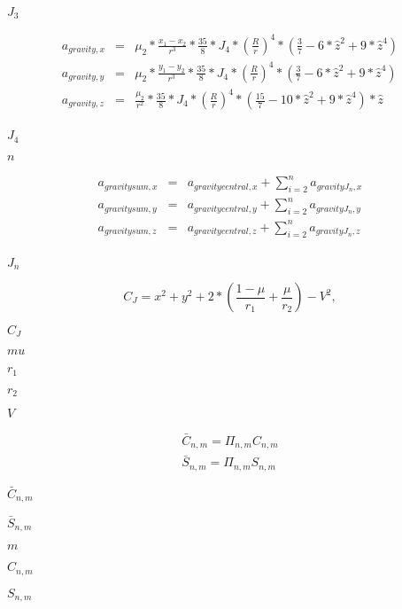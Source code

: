 \documentclass{article}
\begin{document}
$J_{3}$
\pagebreak

\begin{eqnarray*} {a}_{gravity,x} &=& \mu_{2}*\frac{x_{1}-x_{2}}{r^{3}} * \frac{35}{8}*J_{4} * \left(\frac{R}{r}\right)^{4} * (\frac{3}{7}-6*\hat{z}^2+9*\hat{z}^{4}) \\ {a}_{gravity,y} &=& \mu_{2}*\frac{y_{1}-y_{2}}{r^{3}} * \frac{35}{8}*J_{4} * \left(\frac{R}{r}\right)^{4} * (\frac{3}{7}-6*\hat{z}^2+9*\hat{z}^{4}) \\ {a}_{gravity,z} &=& \frac{\mu_{2}}{r^{2}} * \frac{35}{8}*J_{4} * \left(\frac{R}{r}\right)^{4} * (\frac{15}{7}-10*\hat{z}^2+9*\hat{z}^4) * \hat{z} \\ \end{eqnarray*}
\pagebreak

$J_{4}$
\pagebreak

$n$
\pagebreak

\begin{eqnarray*} {a}_{gravity sum,x} &=& {a}_{gravity central,x} + \sum\limits_{i=2}^{n} {a}_{gravity J_{n},x} \\ {a}_{gravity sum,y} &=& {a}_{gravity central,y} + \sum\limits_{i=2}^{n} {a}_{gravity J_{n},y} \\ {a}_{gravity sum,z} &=& {a}_{gravity central,z} + \sum\limits_{i=2}^{n} {a}_{gravity J_{n},z} \\ \end{eqnarray*}
\pagebreak

$J_{n}$
\pagebreak

\[ C_{J} = x^{2} + y^{2} + 2 * \left(\frac{1-\mu}{r_{1}} + \frac{\mu}{r_{2}}\right) - V^{2}, \]
\pagebreak

$C_{J}$
\pagebreak

$mu$
\pagebreak

$r_{1}$
\pagebreak

$r_{2}$
\pagebreak

$V$
\pagebreak

\begin{eqnarray*} \bar{ C }_{ n, m } = \Pi_{ n, m } C_{ n, m } \\ \bar{ S }_{ n, m } = \Pi_{ n, m } S_{ n, m } \end{eqnarray*}
\pagebreak

$ \bar{ C }_{ n, m } $
\pagebreak

$ \bar{ S }_{ n, m } $
\pagebreak

$ m $
\pagebreak

$ C_{ n, m } $
\pagebreak

$ S_{ n, m } $
\pagebreak
\end{document}
